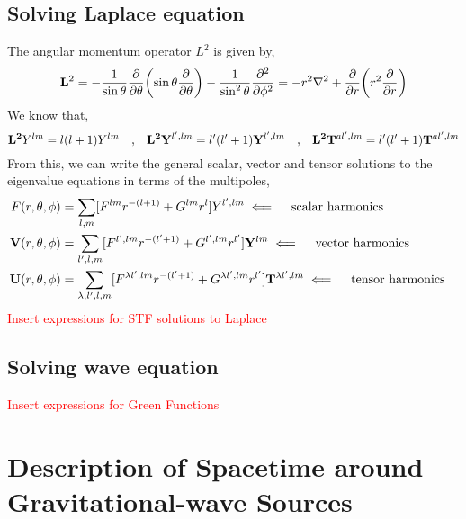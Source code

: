 \documentclass[a4paper,11pt]{article}
\begin{document}
\subsection{Solving Laplace equation}
The angular momentum operator $ L^2 $ is given by,
\begin{equation*}
\vb{L}^2 = -\dfrac{1}{\sin \theta} \pdv{\theta}\qty(\sin \theta \pdv{\theta}) - \dfrac{1}{\sin^2 \theta} \pdv[2]{\phi} = -r^2 \nabla^2 + \pdv{r}\qty(r^2 \pdv{r})
\end{equation*}
We know that,
\begin{equation*}
\vb{L^2} Y^{lm} = l (l+1) Y^{lm} \qq{,} \vb{L^2} \vb{Y}^{l',lm} = l' (l'+1) \vb{Y}^{l',lm} \qq{,} 
\vb{L^2} \vb{T}^{al',lm} = l' (l'+1) \vb{T}^{al',lm} 
\end{equation*}
From this, we can write the general scalar, vector and tensor solutions to the eigenvalue equations in terms of the multipoles,
\begin{align*}
F(r, \theta, \phi ) &= \sum_{l,m} [F^{lm} r^{-(l +1)} + G^{lm } r^l] Y^{l',lm}  \impliedby \qq{scalar harmonics}\\
\vb{V}(r, \theta, \phi ) &= \sum_{l',l,m} [F^{l',lm} r^{-(l' +1)} + G^{l',lm } r^{l'}] \vb{Y}^{lm}  \impliedby \qq{vector harmonics}\\
\vb{U}(r, \theta, \phi ) &=\sum_{\lambda, l',l,m} [F^{\lambda l',lm} r^{-(l' +1)} + G^{\lambda l',lm } r^{l'}] \vb{T}^{\lambda l', lm}  \impliedby \qq{tensor harmonics}
\end{align*}
\textcolor{red}{Insert expressions for STF solutions to Laplace}
\subsection{Solving wave equation}
\textcolor{red}{Insert expressions for Green Functions}
\section{Description of Spacetime around Gravitational-wave Sources}
\end{document}
